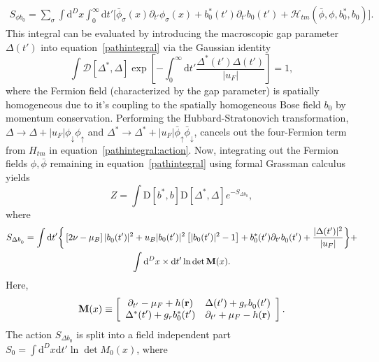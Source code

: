 \documentclass[a4paper,10pt]{article}
\begin{document}
\begin{multline}
\label{pathintegral:action}
 S_{\phi b^{ }_0} = \sum_{\sigma} \int{{\mathrm d}^Dx} \int^\infty_0{{\mathrm d}t'} \bigg[ \bar{\phi}_{\sigma}(x)\partial_{t'} \phi_{\sigma}(x)+ b^*_0(t')\partial_{t'}b^{ }_0(t') + 
{\mathcal H_{tm}}(\bar{\phi},\phi,b^*_0,b^{ }_0)\bigg].
\end{multline}
%
This integral can be evaluated by introducing the macroscopic gap parameter $\Delta(t')$ into equation~\ref{pathintegral} via the Gaussian identity
\begin{equation}
\int {\mathcal D}[\Delta^*,\Delta] \exp{\left[-\int^\infty_0{{\mathrm d}t'}\frac{\Delta^*(t')\Delta(t')}{|u_F|}\right]}=1,
\end{equation}
where the Fermion field (characterized by the gap parameter) is spatially homogeneous due to it's coupling  to the spatially homogeneous Bose field $b_0$ by momentum conservation. Performing the Hubbard-Stratonovich transformation, $\Delta\rightarrow \Delta + |u_F|\phi_\downarrow\phi_\uparrow $ and $\Delta^*\rightarrow \Delta^* + |u_F|\bar{\phi}_\uparrow\bar{\phi}_\downarrow$, cancels out the four-Fermion term from $H_{tm}$ in equation~\ref{pathintegral:action}. Now, integrating out the Fermion fields $\phi,\bar{\phi}$ remaining in equation~\ref{pathintegral} using formal Grassman calculus yields
\begin{equation}
 Z = \int{{\mathrm D}[b^*,b] {\mathrm D}[\Delta^*,\Delta]} e^{-S_{\Delta b^{ }_0}},
\end{equation}
where
\begin{multline}
\nonumber
 S_{\Delta b^{ }_0} = \int{{\mathrm d}t'} \bigg\{ \left[ 2\nu-\mu_B \right] |b^{ }_0(t')|^2 + u_B |b_0(t')|^2\left[|b_0(t')|^2-1 \right] + b^*_0(t')\partial_{t'}b^{ }_0(t')+ \frac{|\Delta(t')|^2}{|u_F|} \bigg\} + \\
\int{{\mathrm d}^Dx \times {\mathrm d}t'} \ln\det{\bf M}(x).
\end{multline}
Here,
\begin{equation}
  {\bf M}(x) \equiv \left[ \begin{array}{cc}
							    \partial_{t'}-\mu_F+h({\bf r})  & \Delta(t')+g_r b^{ }_0(t') \\
							    \Delta^*(t')+g_r b^*_0(t')  & \partial_{t'}+\mu_F-h({\bf r})
                                                             \end{array} \right]. 
\end{equation}
The action $S_{\Delta b^{ }_0}$ is split into a field independent part $S_0= \int{{\mathrm d}^Dx {\mathrm d}t'} \ln\det{M_0(x)}$, where
\end{document}
